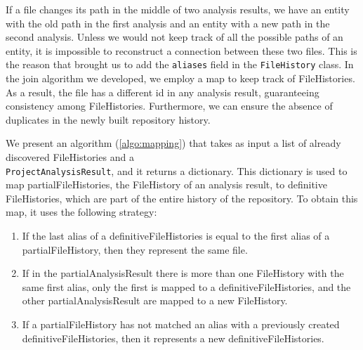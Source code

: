 If a file changes its path in the middle of two analysis results, we have an entity with the old path in the first analysis and an entity with a new path in the second analysis. 
Unless we would not keep track of all the possible paths of an entity, it is impossible to reconstruct a connection between these two files. 
This is the reason that brought us to add the \texttt{aliases} field in the \texttt{FileHistory} class. 
In the join algorithm we developed, we employ a map to keep track of FileHistories.
As a result, the file has a different id in any analysis result, guaranteeing consistency among FileHistories. Furthermore, we can ensure the absence of duplicates in the newly built repository history. 

We present an algorithm (\autoref{algo:mapping}) that takes as input a list of already discovered FileHistories and a \\ \texttt{ProjectAnalysisResult}, and it returns a dictionary.
This dictionary is used to map partialFileHistories, the FileHistory of an analysis result, to definitive FileHistories, which are part of the entire history of the repository. 
To obtain this map, it uses the following strategy:
\begin{enumerate}
    \item If the last alias of a definitiveFileHistories is equal to the first alias of a partialFileHistory, then they represent the same file.
    \item If in the partialAnalysisResult there is more than one FileHistory with the same first alias, only the first is mapped to a definitiveFileHistories, and the other partialAnalysisResult are mapped to a new FileHistory.
    \item If a partialFileHistory has not matched an alias with a previously created definitiveFileHistories, then it represents a new definitiveFileHistories.
\end{enumerate}

